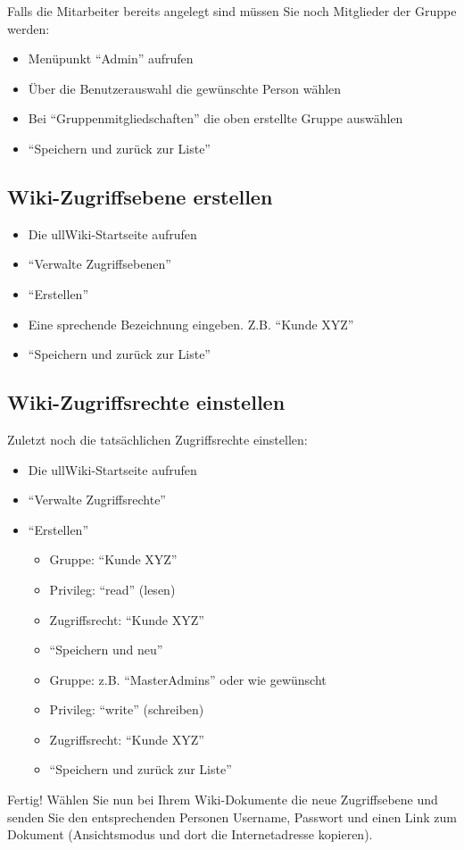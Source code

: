 \documentclass[article, a4paper, oneside, 11pt]{memoir}
\begin{document}
Falls die Mitarbeiter bereits angelegt sind müssen Sie noch Mitglieder der Gruppe werden:
\begin{itemize}
\item Menüpunkt "`Admin"' aufrufen
\item Über die Benutzerauswahl die gewünschte Person wählen
\item Bei "`Gruppenmitgliedschaften"' die oben erstellte Gruppe auswählen
\item "`Speichern und zurück zur Liste"'
\end{itemize}

\subsection{Wiki-Zugriffsebene erstellen}
\begin{itemize}
 \item Die ullWiki-Startseite aufrufen
 \item "`Verwalte Zugriffsebenen"'
 \item "`Erstellen"'
 \item Eine sprechende Bezeichnung eingeben. Z.B. "`Kunde XYZ"'
 \item "`Speichern und zurück zur Liste"'
\end{itemize}

\subsection{Wiki-Zugriffsrechte einstellen}
Zuletzt noch die tatsächlichen Zugriffsrechte einstellen:
\begin{itemize}
 \item Die ullWiki-Startseite aufrufen
 \item "`Verwalte Zugriffsrechte"'
 \item "`Erstellen"'
    \begin{itemize}
      \item Gruppe: "`Kunde XYZ"'
      \item Privileg: "`read"' (lesen)
      \item Zugriffsrecht: "`Kunde XYZ"'
      \item "`Speichern und neu"'
    \end{itemize}
    \begin{itemize}
      \item Gruppe: z.B. "`MasterAdmins"' oder wie gewünscht
      \item Privileg: "`write"' (schreiben)
      \item Zugriffsrecht: "`Kunde XYZ"'
      \item "`Speichern und zurück zur Liste"'
    \end{itemize}
\end{itemize}

Fertig! Wählen Sie nun bei Ihrem Wiki-Dokumente die neue Zugriffsebene und senden Sie den entsprechenden Personen Username, Passwort und einen Link zum Dokument (Ansichtsmodus und dort die Internetadresse kopieren).
\end{document}
